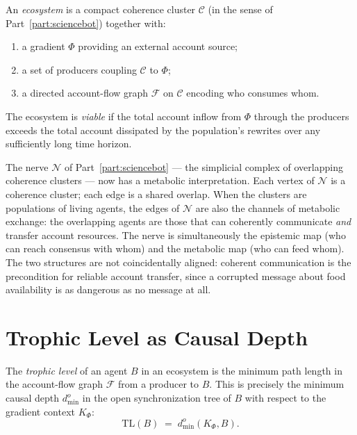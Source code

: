 \begin{definition}[Ecosystem]
An \emph{ecosystem} is a compact coherence cluster
$\mathcal{C}$ (in the sense of Part~\ref{part:sciencebot}) together with:
\begin{enumerate}[label=(\roman*)]
  \item a gradient $\Phi$ providing an external account source;
  \item a set of producers coupling $\mathcal{C}$ to $\Phi$;
  \item a directed account-flow graph $\mathcal{F}$ on
        $\mathcal{C}$ encoding who consumes whom.
\end{enumerate}
The ecosystem is \emph{viable} if the total account inflow from
$\Phi$ through the producers exceeds the total account dissipated
by the population's rewrites over any sufficiently long time
horizon.
\end{definition}

\begin{remark}
The nerve $\mathcal{N}$ of Part~\ref{part:sciencebot} --- the simplicial complex of
overlapping coherence clusters --- now has a metabolic
interpretation.
Each vertex of $\mathcal{N}$ is a coherence cluster; each edge
is a shared overlap.
When the clusters are populations of living agents, the edges of
$\mathcal{N}$ are also the channels of metabolic exchange: the
overlapping agents are those that can coherently communicate
\emph{and} transfer account resources.
The nerve is simultaneously the epistemic map (who can reach
consensus with whom) and the metabolic map (who can feed whom).
The two structures are not coincidentally aligned: coherent
communication is the precondition for reliable account transfer,
since a corrupted message about food availability is as
dangerous as no message at all.
\end{remark}

\section{Trophic Level as Causal Depth}

\begin{proposition}
\label{prop:trophic}
The \emph{trophic level} of an agent $B$ in an ecosystem is
the minimum path length in the account-flow graph $\mathcal{F}$
from a producer to $B$.
This is precisely the minimum causal depth $d^o_{\min}$ in the
open synchronization tree of $B$ with respect to the gradient
context $K_\Phi$:
\[
  \mathrm{TL}(B) \;=\; d^o_{\min}(K_\Phi, B).
\]
\end{proposition}

